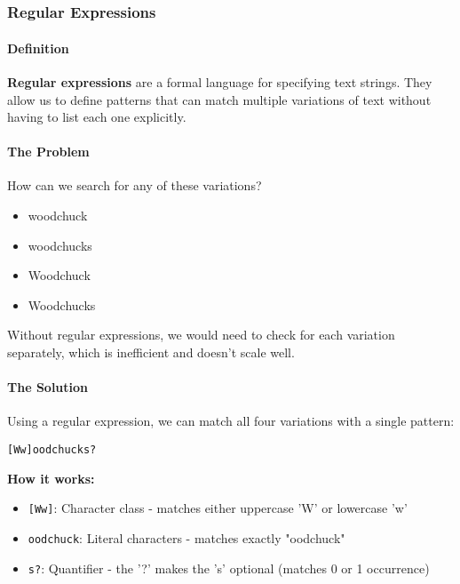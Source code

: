 \documentclass[11pt,a4paper]{article}
\theoremstyle{definition}
\theoremstyle{plain}
\theoremstyle{remark}
\begin{document}
\newpage
\part{}

\section{Regular Expressions}

\subsection{Definition}

\textbf{Regular expressions} are a formal language for specifying text strings. They allow us to define patterns that can match multiple variations of text without having to list each one explicitly.

\subsection{The Problem}

How can we search for any of these variations?
\begin{itemize}
    \item woodchuck
    \item woodchucks
    \item Woodchuck
    \item Woodchucks
\end{itemize}

Without regular expressions, we would need to check for each variation separately, which is inefficient and doesn't scale well.

\subsection{The Solution}

Using a regular expression, we can match all four variations with a single pattern:

\begin{verbatim}
[Ww]oodchucks?
\end{verbatim}

\textbf{How it works:}
\begin{itemize}
    \item \texttt{[Ww]}: Character class - matches either uppercase 'W' or lowercase 'w'
    \item \texttt{oodchuck}: Literal characters - matches exactly "oodchuck"
    \item \texttt{s?}: Quantifier - the '?' makes the 's' optional (matches 0 or 1 occurrence)
\end{itemize}
\end{document}
